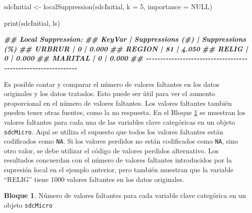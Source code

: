 \documentclass[
]{book}
\newenvironment{Shaded}{\begin{snugshade}}{\end{snugshade}}
\newcommand{\AttributeTok}[1]{\textcolor[rgb]{0.77,0.63,0.00}{#1}}
\newcommand{\ConstantTok}[1]{\textcolor[rgb]{0.00,0.00,0.00}{#1}}
\newcommand{\DecValTok}[1]{\textcolor[rgb]{0.00,0.00,0.81}{#1}}
\newcommand{\DocumentationTok}[1]{\textcolor[rgb]{0.56,0.35,0.01}{\textbf{\textit{#1}}}}
\newcommand{\FunctionTok}[1]{\textcolor[rgb]{0.00,0.00,0.00}{#1}}
\newcommand{\NormalTok}[1]{#1}
\newcommand{\OtherTok}[1]{\textcolor[rgb]{0.56,0.35,0.01}{#1}}
\newcommand{\StringTok}[1]{\textcolor[rgb]{0.31,0.60,0.02}{#1}}
\theoremstyle{definition}
\theoremstyle{definition}
\newtheorem{example}{Bloque}[chapter]
\theoremstyle{definition}
\theoremstyle{definition}
\theoremstyle{remark}
\begin{document}
\begin{Shaded}
\begin{Highlighting}[]
\NormalTok{sdcInitial }\OtherTok{\textless{}{-}} \FunctionTok{localSuppression}\NormalTok{(sdcInitial, }\AttributeTok{k =} \DecValTok{5}\NormalTok{, }\AttributeTok{importance =} \ConstantTok{NULL}\NormalTok{)}

\FunctionTok{print}\NormalTok{(sdcInitial, }\StringTok{\textquotesingle{}ls\textquotesingle{}}\NormalTok{)}

\DocumentationTok{\#\# Local Suppression:}
\DocumentationTok{\#\#   KeyVar | Suppressions (\#) | Suppressions (\%)}
\DocumentationTok{\#\#   URBRUR |                0 |            0.000}
\DocumentationTok{\#\#   REGION |               81 |            4.050}
\DocumentationTok{\#\#    RELIG |                0 |            0.000}
\DocumentationTok{\#\#  MARITAL |                0 |            0.000}
\DocumentationTok{\#\# {-}{-}{-}{-}{-}{-}{-}{-}{-}{-}{-}{-}{-}{-}{-}{-}{-}{-}{-}{-}{-}{-}{-}{-}{-}{-}{-}{-}{-}{-}{-}{-}{-}{-}{-}{-}{-}{-}{-}{-}{-}{-}{-}{-}{-}{-}{-}{-}{-}{-}{-}{-}{-}{-}{-}{-}{-}{-}{-}{-}{-}{-}}
\end{Highlighting}
\end{Shaded}

Es posible contar y comparar el número de valores faltantes en los datos originales y los datos tratados. Esto puede ser útil para ver el aumento proporcional en el número de valores faltantes. Los valores faltantes
también pueden tener otras fuentes, como la no respuesta. En el Bloque \ref{exm:bloque2lbn} se muestran los valores faltantes para cada una de las variables clave categóricas en un objeto \texttt{sdcMicro}. Aquí se utiliza el supuesto que todos los valores faltantes están codificados como \texttt{NA}. Si los valores perdidos no están codificados como \texttt{NA}, sino otro valor, se debe utilizar el código de valores perdidos alternativo. Los resultados concuerdan con el número de valores faltantes introducidos por la supresión local en el ejemplo anterior, pero también muestran que la variable ``RELIG'' tiene 1000 valores faltantes en los datos originales.

\begin{example}
\protect\hypertarget{exm:bloque2lbn}{}\label{exm:bloque2lbn}Número de valores faltantes para cada variable clave categórica en un objeto \texttt{sdcMicro}
\end{example}
\end{document}
